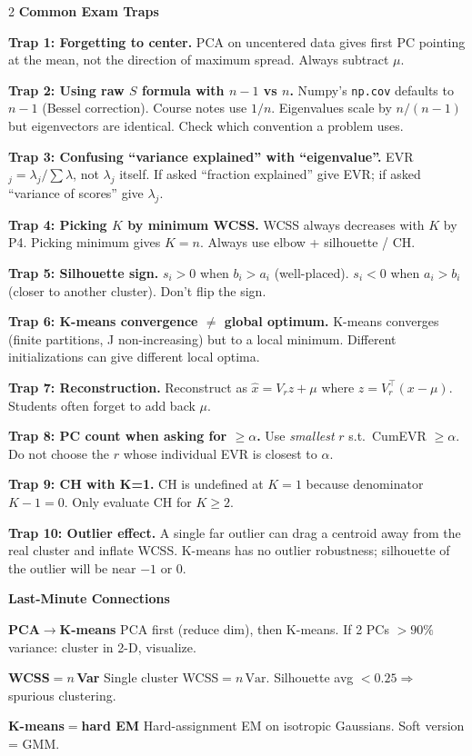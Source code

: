 \documentclass[10pt,fleqn]{article}
\newcommand{\shead}[1]{\vspace{0.1ex}\textbf{\scriptsize #1}\par}
\newcommand{\qa}[2]{\textbf{#1} #2\par}
\begin{document}
\begin{multicols*}{2}
\shead{Common Exam Traps}
\qa{Trap 1: Forgetting to center.}{PCA on uncentered data gives first PC pointing at the mean, not the direction of maximum spread. Always subtract \(\mu\).}
\qa{Trap 2: Using raw \(S\) formula with \(n-1\) vs \(n\).}{Numpy's \texttt{np.cov} defaults to \(n-1\) (Bessel correction). Course notes use \(1/n\). Eigenvalues scale by \(n/(n-1)\) but eigenvectors are identical. Check which convention a problem uses.}
\qa{Trap 3: Confusing ``variance explained'' with ``eigenvalue''.}{EVR\(_j = \lambda_j/\sum\lambda\), not \(\lambda_j\) itself. If asked ``fraction explained'' give EVR; if asked ``variance of scores'' give \(\lambda_j\).}
\qa{Trap 4: Picking \(K\) by minimum WCSS.}{WCSS always decreases with \(K\) by P4. Picking minimum gives \(K=n\). Always use elbow + silhouette / CH.}
\qa{Trap 5: Silhouette sign.}{\(s_i > 0\) when \(b_i > a_i\) (well-placed). \(s_i < 0\) when \(a_i > b_i\) (closer to another cluster). Don't flip the sign.}
\qa{Trap 6: K-means convergence \(\ne\) global optimum.}{K-means converges (finite partitions, J non-increasing) but to a local minimum. Different initializations can give different local optima.}
\qa{Trap 7: Reconstruction.}{Reconstruct as \(\hat x = V_r z + \mu\) where \(z = V_r^\top(x-\mu)\). Students often forget to add back \(\mu\).}
\qa{Trap 8: PC count when asking for \(\ge\alpha\).}{Use \emph{smallest} \(r\) s.t.\ CumEVR \(\ge\alpha\). Do not choose the \(r\) whose individual EVR is closest to \(\alpha\).}
\qa{Trap 9: CH with K=1.}{CH is undefined at \(K=1\) because denominator \(K-1=0\). Only evaluate CH for \(K\ge 2\).}
\qa{Trap 10: Outlier effect.}{A single far outlier can drag a centroid away from the real cluster and inflate WCSS. K-means has no outlier robustness; silhouette of the outlier will be near \(-1\) or \(0\).}

\shead{Last-Minute Connections}
\qa{PCA\(\to\)K-means}{PCA first (reduce dim), then K-means. If 2 PCs \(>90\%\) variance: cluster in 2-D, visualize.}
\qa{WCSS\(=n\,\)Var}{Single cluster WCSS\(=n\,\mathrm{Var}\). Silhouette avg \(<0.25\Rightarrow\) spurious clustering.}
\qa{K-means\(=\)hard EM}{Hard-assignment EM on isotropic Gaussians. Soft version = GMM.}


\end{multicols*}
\end{document}
